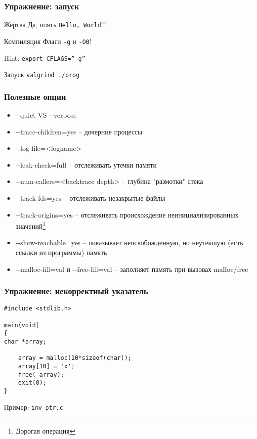 \begin{frame}[fragile]
	\frametitle{Упражнение: запуск}

	\begin{block}{Жертва}
	Да, опять {\tt Hello, World}!!!

	\end{block}

	\begin{block}{Компиляция}
		Флаги {\tt -g} и {\tt -O0}!

		Hint: {\tt export CFLAGS=''-g''}
	\end{block}

	\begin{block}{Запуск}
		{\tt valgrind ./prog}
	\end{block}

\end{frame}

\begin{frame}[fragile]
	\frametitle{Полезные опции}

	\begin{itemize}
		\item -{}-quiet VS -{}-verbose
		\item -{}-trace-children=yes -- дочерние процессы
		\item -{}-log-file=<logname>
		\item -{}-leak-check=full -- отслеживать утечки памяти 
		\item -{}-num-callers=<backtrace depth> -- глубина "размотки" стека
		\item -{}-track-fds=yes -- отслеживать незакрытые файлы
		\item -{}-track-origins=yes -- отслеживать происхождение неинициализированных значений\footnote{Дорогая операция}
		\item -{}-show-reachable=yes -- показывает неосвобожденную,  но неутекшую (есть ссылки из программы) память
		\item -{}-malloc-fill=val и -{}-free-fill=val -- заполняет память при вызовах malloc/free

	\end{itemize}

\end{frame}


		
\begin{frame}[fragile]
	\frametitle{Упражнение: некорректный указатель}

	\begin{lstlisting}
#include <stdlib.h>

main(void)
{
char *array;

    array = malloc(10*sizeof(char));
    array[10] = 'x';
    free( array);
    exit(0);
}
	\end{lstlisting}

	Пример: {\tt inv\_ptr.c}

\end{frame}

